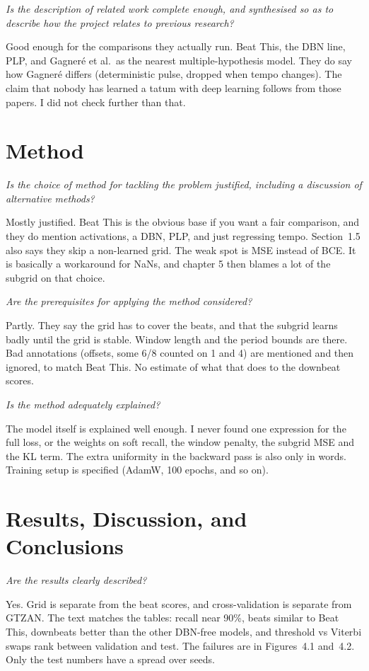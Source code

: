 \documentclass[11pt,a4paper]{article}
\newcommand{\prompt}[1]{%
  \par\medskip
  \noindent\textit{#1}%
  \par\smallskip
}
\begin{document}
\prompt{Is the description of related work complete enough, and synthesised so as to describe how the project relates to previous research?}

Good enough for the comparisons they actually run. Beat This, the DBN line, PLP, and Gagneré et al.\ as the nearest multiple-hypothesis model. They do say how Gagneré differs (deterministic pulse, dropped when tempo changes). The claim that nobody has learned a tatum with deep learning follows from those papers. I did not check further than that.

\section{Method}

\prompt{Is the choice of method for tackling the problem justified, including a discussion of alternative methods?}

Mostly justified. Beat This is the obvious base if you want a fair comparison, and they do mention activations, a DBN, PLP, and just regressing tempo. Section~1.5 also says they skip a non-learned grid. The weak spot is MSE instead of BCE. It is basically a workaround for NaNs, and chapter 5 then blames a lot of the subgrid on that choice.

\prompt{Are the prerequisites for applying the method considered?}

Partly. They say the grid has to cover the beats, and that the subgrid learns badly until the grid is stable. Window length and the period bounds are there. Bad annotations (offsets, some 6/8 counted on 1 and 4) are mentioned and then ignored, to match Beat This. No estimate of what that does to the downbeat scores.

\prompt{Is the method adequately explained?}

The model itself is explained well enough. I never found one expression for the full loss, or the weights on soft recall, the window penalty, the subgrid MSE and the KL term. The extra uniformity in the backward pass is also only in words. Training setup is specified (AdamW, 100 epochs, and so on).

\section{Results, Discussion, and Conclusions}

\prompt{Are the results clearly described?}

Yes. Grid is separate from the beat scores, and cross-validation is separate from GTZAN. The text matches the tables: recall near 90\%, beats similar to Beat This, downbeats better than the other DBN-free models, and threshold vs Viterbi swaps rank between validation and test. The failures are in Figures~4.1 and~4.2. Only the test numbers have a spread over seeds.
\end{document}
